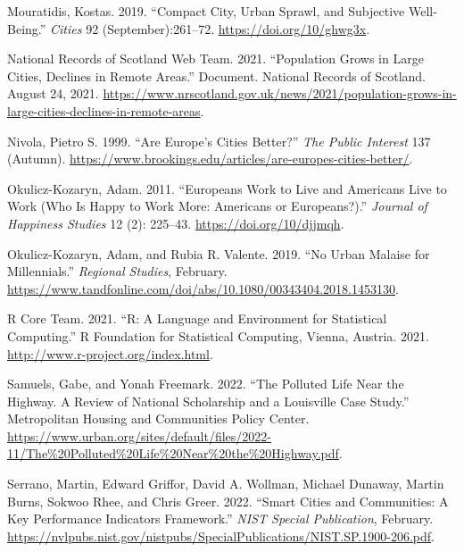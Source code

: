 \documentclass[
  english,
  12pt,
  a4paper,
]{scrartcl}
\newlength{\cslhangindent}
\newenvironment{CSLReferences}[2] %
 {\begin{list}{}{%
  \setlength{\itemindent}{0pt}
  \setlength{\leftmargin}{0pt}
  \setlength{\parsep}{0pt}
  \ifodd #1
   \setlength{\leftmargin}{\cslhangindent}
   \setlength{\itemindent}{-1\cslhangindent}
  \fi
  \setlength{\itemsep}{#2\baselineskip}}}
 {\end{list}}
\begin{document}
\begin{CSLReferences}{1}{0}
Mouratidis, Kostas. 2019. {``Compact City, Urban Sprawl, and Subjective
Well-Being.''} \emph{Cities} 92 (September):261--72.
\url{https://doi.org/10/ghwg3x}.

National Records of Scotland Web Team. 2021. {``Population {Grows} in
{Large Cities}, {Declines} in {Remote Areas}.''} Document. National
Records of Scotland. August 24, 2021.
\url{https://www.nrscotland.gov.uk/news/2021/population-grows-in-large-cities-declines-in-remote-areas}.

Nivola, Pietro S. 1999. {``Are {Europe}'s Cities Better?''} \emph{The
Public Interest} 137 (Autumn).
\url{https://www.brookings.edu/articles/are-europes-cities-better/}.

Okulicz-Kozaryn, Adam. 2011. {``Europeans Work to Live and {Americans}
Live to Work ({Who} Is Happy to Work More: {Americans} or
{Europeans}?).''} \emph{Journal of Happiness Studies} 12 (2): 225--43.
\url{https://doi.org/10/djjmqh}.

Okulicz-Kozaryn, Adam, and Rubia R. Valente. 2019. {``No Urban Malaise
for {Millennials}.''} \emph{Regional Studies}, February.
\url{https://www.tandfonline.com/doi/abs/10.1080/00343404.2018.1453130}.

R Core Team. 2021. {``R: {A} Language and Environment for Statistical
Computing.''} R Foundation for Statistical Computing, Vienna, Austria.
2021. \url{http://www.r-project.org/index.html}.

Samuels, Gabe, and Yonah Freemark. 2022. {``The Polluted Life Near the
Highway. {A} Review of National Scholarship and a {Louisville} Case
Study.''} {Metropolitan Housing and Communities Policy Center}.
\url{https://www.urban.org/sites/default/files/2022-11/The\%20Polluted\%20Life\%20Near\%20the\%20Highway.pdf}.

Serrano, Martin, Edward Griffor, David A. Wollman, Michael Dunaway,
Martin Burns, Sokwoo Rhee, and Chris Greer. 2022. {``Smart Cities and
Communities: {A} Key Performance Indicators Framework.''} \emph{NIST
Special Publication}, February.
\url{https://nvlpubs.nist.gov/nistpubs/SpecialPublications/NIST.SP.1900-206.pdf}.


\end{CSLReferences}
\end{document}
